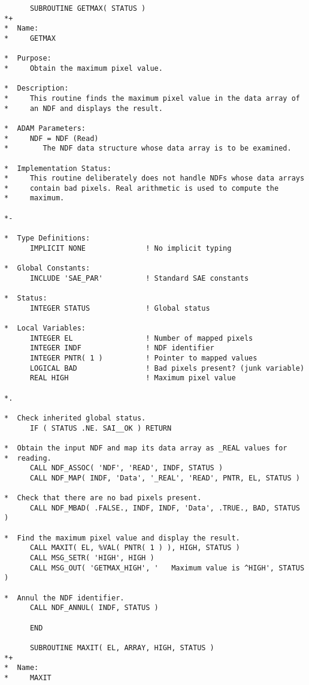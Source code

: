 \documentclass[twoside,11pt]{article}
\begin{document}
\small
\begin{verbatim}
      SUBROUTINE GETMAX( STATUS )
*+
*  Name:
*     GETMAX

*  Purpose:
*     Obtain the maximum pixel value.

*  Description:
*     This routine finds the maximum pixel value in the data array of
*     an NDF and displays the result.

*  ADAM Parameters:
*     NDF = NDF (Read)
*        The NDF data structure whose data array is to be examined.

*  Implementation Status:
*     This routine deliberately does not handle NDFs whose data arrays
*     contain bad pixels. Real arithmetic is used to compute the
*     maximum.

*-
      
*  Type Definitions:
      IMPLICIT NONE              ! No implicit typing

*  Global Constants:
      INCLUDE 'SAE_PAR'          ! Standard SAE constants

*  Status:
      INTEGER STATUS             ! Global status

*  Local Variables:
      INTEGER EL                 ! Number of mapped pixels
      INTEGER INDF               ! NDF identifier
      INTEGER PNTR( 1 )          ! Pointer to mapped values
      LOGICAL BAD                ! Bad pixels present? (junk variable)
      REAL HIGH                  ! Maximum pixel value

*.

*  Check inherited global status.
      IF ( STATUS .NE. SAI__OK ) RETURN

*  Obtain the input NDF and map its data array as _REAL values for
*  reading.
      CALL NDF_ASSOC( 'NDF', 'READ', INDF, STATUS )
      CALL NDF_MAP( INDF, 'Data', '_REAL', 'READ', PNTR, EL, STATUS )

*  Check that there are no bad pixels present.
      CALL NDF_MBAD( .FALSE., INDF, INDF, 'Data', .TRUE., BAD, STATUS )

*  Find the maximum pixel value and display the result.
      CALL MAXIT( EL, %VAL( PNTR( 1 ) ), HIGH, STATUS )
      CALL MSG_SETR( 'HIGH', HIGH )
      CALL MSG_OUT( 'GETMAX_HIGH', '   Maximum value is ^HIGH', STATUS )

*  Annul the NDF identifier.
      CALL NDF_ANNUL( INDF, STATUS )

      END

      SUBROUTINE MAXIT( EL, ARRAY, HIGH, STATUS )
*+
*  Name:
*     MAXIT


\end{verbatim}
\end{document}

